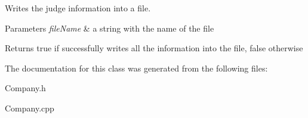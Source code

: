 Writes the judge information into a file. 


\begin{DoxyParams}{Parameters}
{\em file\+Name} & a string with the name of the file \\
\hline
\end{DoxyParams}
\begin{DoxyReturn}{Returns}
true if successfully writes all the information into the file, false otherwise 
\end{DoxyReturn}


The documentation for this class was generated from the following files\+:\begin{DoxyCompactItemize}
\item 
Company.\+h\item 
Company.\+cpp\end{DoxyCompactItemize}
